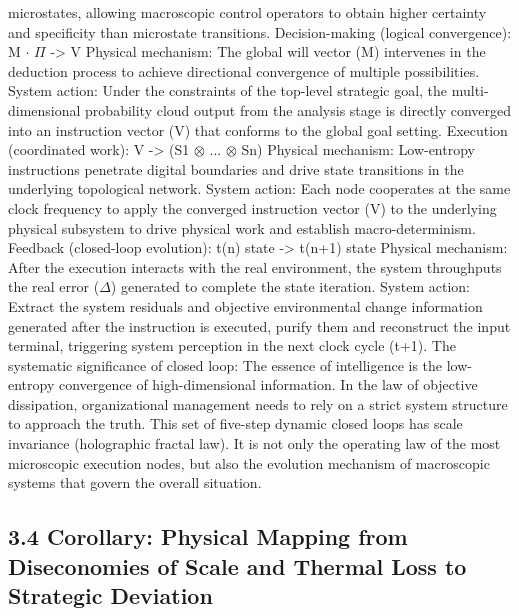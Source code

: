 \documentclass[11pt,a4paper]{article}
\begin{document}
microstates, allowing macroscopic control operators to obtain higher certainty and specificity than microstate transitions. Decision-making (logical convergence): M $\cdot$ $\Pi$ -> V Physical mechanism: The global will vector (M) intervenes in the deduction process to achieve directional convergence of multiple possibilities. System action: Under the constraints of the top-level strategic goal, the multi-dimensional probability cloud output from the analysis stage is directly converged into an instruction vector (V) that conforms to the global goal setting. Execution (coordinated work): V -> (S1 $\otimes$ ... $\otimes$ Sn) Physical mechanism: Low-entropy instructions penetrate digital boundaries and drive state transitions in the underlying topological network. System action: Each node cooperates at the same clock frequency to apply the converged instruction vector (V) to the underlying physical subsystem to drive physical work and establish macro-determinism. Feedback (closed-loop evolution): t(n) state -> t(n+1) state Physical mechanism: After the execution interacts with the real environment, the system throughputs the real error ($\Delta$) generated to complete the state iteration. System action: Extract the system residuals and objective environmental change information generated after the instruction is executed, purify them and reconstruct the input terminal, triggering system perception in the next clock cycle (t+1). The systematic significance of closed loop: The essence of intelligence is the low-entropy convergence of high-dimensional information. In the law of objective dissipation, organizational management needs to rely on a strict system structure to approach the truth. This set of five-step dynamic closed loops has scale invariance (holographic fractal law). It is not only the operating law of the most microscopic execution nodes, but also the evolution mechanism of macroscopic systems that govern the overall situation.


\subsection*{3.4 Corollary: Physical Mapping from Diseconomies of Scale and Thermal Loss to Strategic Deviation}
\end{document}
